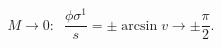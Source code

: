 \begin{equation}
\label{sigma1}
M\rightarrow 0:\;\;\frac{\phi \sigma^1}{s}=\pm \arcsin v \rightarrow \pm \frac{\pi}{2}.
\end{equation}

